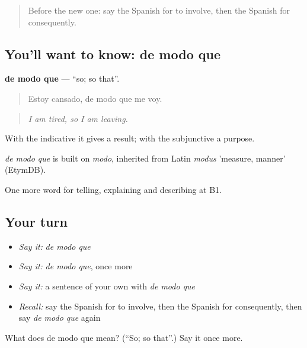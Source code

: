 \label{lesson:ES-C582-de-modo-que}



\begin{quote}
Before the new one: say the Spanish for to involve, then the Spanish for consequently.
\end{quote}

\subsection*{You'll want to know: de modo que}
\textbf{de modo que} — \textquotedblleft{}so; so that\textquotedblright{}.

\begin{quote}
Estoy cansado, de modo que me voy.
\end{quote}

\begin{quote}
\emph{I am tired, so I am leaving.}
\end{quote}

With the indicative it gives a result; with the subjunctive a purpose.

\begin{cousinweb}
\emph{de modo que} is built on \emph{modo}, inherited from Latin \emph{modus} 'measure, manner' (EtymDB).
\end{cousinweb}

\begin{grammarlens}[title={What you've built}]
One more word for telling, explaining and describing at B1.
\end{grammarlens}

\subsection*{Your turn}
\begin{itemize}
\raggedright
  \item \emph{Say it:} \emph{de modo que}
  \item \emph{Say it:} \emph{de modo que}, once more
  \item \emph{Say it:} a sentence of your own with \emph{de modo que}
  \item \emph{Recall:} say the Spanish for to involve, then the Spanish for consequently, then say \emph{de modo que} again
\end{itemize}

\begin{tcolorbox}[breakable,colback=teal!4,colframe=teal!35!black,title={Before you move on}]
What does de modo que mean? (\textquotedblleft{}So; so that\textquotedblright{}.) Say it once more.
\end{tcolorbox}
